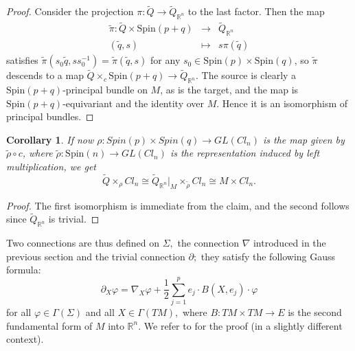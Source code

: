 \documentclass{amsart}
\newtheorem{cor}{Corollary}
\begin{document}
\begin{proof}
Consider the projection $\pi: \tilde{Q}\rightarrow \tilde{Q}_{\mathbb{R}^n}$ to the last factor. Then the map 
\begin{eqnarray*}
\tilde{\pi}: \tilde{Q}\times{\mathrm{Spin}}(p+q)&\rightarrow& \tilde{Q}_{\mathbb{R}^n}\\
(\tilde{q},s)&\mapsto& s\pi(\tilde{q})
\end{eqnarray*} 
satisfies $\tilde{\pi}(s_0\tilde{q},ss_0^{-1})=\tilde{\pi}(\tilde{q},s)$ for any $s_0\in{\mathrm{Spin}}(p)\times {\mathrm{Spin}}(q)$, so $\tilde \pi$ descends to a map $\tilde Q \times_c {\mathrm{Spin}}(p+q) \to \tilde Q_{\mathbb{R}^n}$.  The source is clearly a ${\mathrm{Spin}}(p+q)$-principal bundle on $M$, as is the target, and the map is ${\mathrm{Spin}}(p+q)$-equivariant and the identity over $M$.  Hence it is an isomorphism of principal bundles. 
\end{proof}
\begin{cor} If now $\rho:Spin(p)\times Spin(q)\rightarrow GL(Cl_n)$ is the map given by $\tilde{\rho}\circ c$, where $\tilde{\rho}:{\mathrm{Spin}}(n)\rightarrow GL(Cl_n)$ is the representation induced by left multiplication, we get
$$\tilde{Q}\times_{\rho}Cl_n \cong \tilde{Q}_{\mathbb{R}^n}|_M\times_{\tilde{\rho}}Cl_n \cong M\times Cl_n.$$
\end{cor}
\begin{proof} The first isomorphism is immediate from the claim, and the second follows since $\tilde Q_{\mathbb{R}^n}$ is trivial.
\end{proof}

Two connections are thus defined on $\Sigma,$ the connection $\nabla$ introduced in the previous section and the trivial connection $\partial;$ they satisfy the following Gauss formula:
\begin{equation}\label{gauss formula}
\partial_X\varphi=\nabla_X\varphi+\frac{1}{2}\sum_{j=1}^p e_j\cdot B(X,e_j)\cdot\varphi
\end{equation} 
for all $\varphi\in\Gamma(\Sigma)$ and all $X\in \Gamma(TM),$ where $B:TM\times TM\rightarrow E$ is the second fundamental form of $M$ into ${\mathbb{R}}^n.$ We refer to \cite{Ba} for the proof (in a slightly different context).
\end{document}
